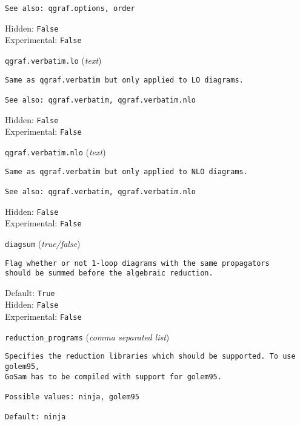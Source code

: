\begin{basedescript}{\desclabelstyle{\pushlabel}}
\begin{verbatim}
See also: qgraf.options, order
\end{verbatim}
Hidden: \verb|False|
\\Experimental: \verb|False|
\\\item[\colorbox{gray!30}{\texttt{qgraf.verbatim.lo}}] (\textit{text})
\begin{verbatim}
Same as qgraf.verbatim but only applied to LO diagrams.

See also: qgraf.verbatim, qgraf.verbatim.nlo
\end{verbatim}
Hidden: \verb|False|
\\Experimental: \verb|False|
\\\item[\colorbox{gray!30}{\texttt{qgraf.verbatim.nlo}}] (\textit{text})
\begin{verbatim}
Same as qgraf.verbatim but only applied to NLO diagrams.

See also: qgraf.verbatim, qgraf.verbatim.nlo
\end{verbatim}
Hidden: \verb|False|
\\Experimental: \verb|False|
\\\item[\colorbox{gray!30}{\texttt{diagsum}}] (\textit{true/false})
\begin{verbatim}
Flag whether or not 1-loop diagrams with the same propagators
should be summed before the algebraic reduction.
\end{verbatim}
Default: \verb|True|
\\Hidden: \verb|False|
\\Experimental: \verb|False|
\\\item[\colorbox{gray!30}{\texttt{reduction\_programs}}] (\textit{comma separated list})
\begin{verbatim}
Specifies the reduction libraries which should be supported. To use golem95,
GoSam has to be compiled with support for golem95.

Possible values: ninja, golem95

Default: ninja


\end{verbatim}
\end{basedescript}
